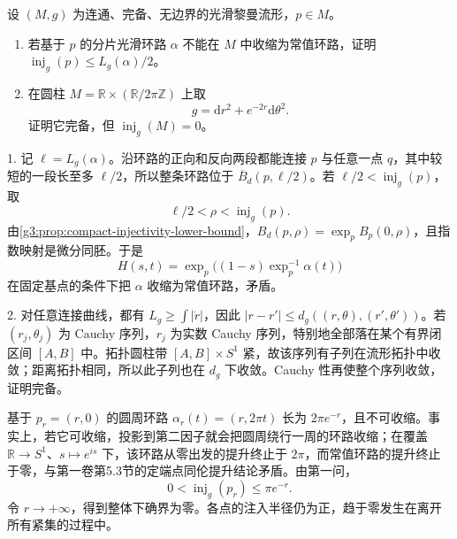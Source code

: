\begin{exercise}\label{g3:ex:complete-cusp-zero-injectivity}
	设 \((M,g)\) 为连通、完备、无边界的光滑黎曼流形，\(p\in M\)。
	\begin{enumerate}
		\item 若基于 \(p\) 的分片光滑环路 \(\alpha\) 不能在 \(M\) 中收缩为常值环路，证明 \(\operatorname{inj}_g(p)\le L_g(\alpha)/2\)。
		\item 在圆柱 \(M=\mathbb R\times(\mathbb R/2\pi\mathbb Z)\) 上取
		\[
			g=\mathrm dr^2+e^{-2r}\mathrm d\theta^2.
		\]
		证明它完备，但 \(\operatorname{inj}_g(M)=0\)。
	\end{enumerate}
\end{exercise}
\begin{solution}
	1. 记 \(\ell=L_g(\alpha)\)。沿环路的正向和反向两段都能连接 \(p\) 与任意一点 \(q\)，其中较短的一段长至多 \(\ell/2\)，所以整条环路位于 \(\overline B_d(p,\ell/2)\)。若 \(\ell/2<\operatorname{inj}_g(p)\)，取
	\[
		\ell/2<\rho<\operatorname{inj}_g(p).
	\]
	由\cref{g3:prop:compact-injectivity-lower-bound}，\(B_d(p,\rho)=\exp_p B_p(0,\rho)\)，且指数映射是微分同胚。于是
	\[
		H(s,t)=\exp_p\bigl((1-s)\exp_p^{-1}\alpha(t)\bigr)
	\]
	在固定基点的条件下把 \(\alpha\) 收缩为常值环路，矛盾。

	2. 对任意连接曲线，都有 \(L_g\ge\int|\dot r|\)，因此 \(|r-r'|\le d_g((r,\theta),(r',\theta'))\)。若 \((r_j,\theta_j)\) 为 Cauchy 序列，\(r_j\) 为实数 Cauchy 序列，特别地全部落在某个有界闭区间 \([A,B]\) 中。拓扑圆柱带 \([A,B]\times S^1\) 紧，故该序列有子列在流形拓扑中收敛；距离拓扑相同，所以此子列也在 \(d_g\) 下收敛。Cauchy 性再使整个序列收敛，证明完备。

	基于 \(p_r=(r,0)\) 的圆周环路 \(\alpha_r(t)=(r,2\pi t)\) 长为 \(2\pi e^{-r}\)，且不可收缩。事实上，若它可收缩，投影到第二因子就会把圆周绕行一周的环路收缩；在覆盖 \(\mathbb R\to S^1\)、\(s\mapsto e^{is}\) 下，该环路从零出发的提升终止于 \(2\pi\)，而常值环路的提升终止于零，与第一卷第5.3节的定端点同伦提升结论矛盾。由第一问，
	\[
		0<\operatorname{inj}_g(p_r)\le\pi e^{-r}.
	\]
	令 \(r\to+\infty\)，得到整体下确界为零。各点的注入半径仍为正，趋于零发生在离开所有紧集的过程中。
\end{solution}

